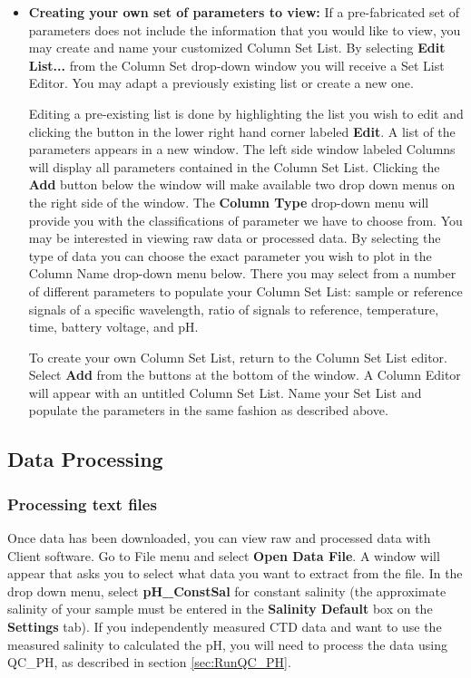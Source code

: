 \begin{itemize}
    \item[] \textbf{Creating your own set of parameters to view:}
    If a pre-fabricated set of parameters does not include the information that you would like to view, you may create and name your customized Column Set List. By selecting \textbf{Edit List...} from the Column Set drop-down window you will receive a Set List Editor. You may adapt a previously existing list or create a new one. 
    
    Editing a pre-existing list is done by highlighting the list you wish to edit and clicking the button in the lower right hand corner labeled \textbf{Edit}. A list of the parameters appears in a new window. The left side window labeled Columns will display all parameters contained in the Column Set List. Clicking the \textbf{Add} button below the window will make available two drop down menus on the right side of the window. The \textbf{Column Type} drop-down menu will provide you with the classifications of parameter we have to choose from. You may be interested in viewing raw data or processed data. By selecting the type of data you can choose the exact parameter you wish to plot in the Column Name drop-down menu below. There you may select from a number of different parameters to populate your Column Set List: sample or reference signals of a specific wavelength, ratio of signals to reference, temperature, time, battery voltage, and pH. 
    
    To create your own Column Set List, return to the Column Set List editor. Select \textbf{Add} from the buttons at the bottom of the window. A Column Editor will appear with an untitled Column Set List. Name your Set List and populate the parameters in the same fashion as described above.  
\end{itemize}


\subsection{Data Processing}

\subsubsection{Processing text files}

\ifcase \inst	%

Once data has been downloaded, you can view raw and processed data with \instType{} Client software. Go to File menu and select \textbf{Open Data File}. A window will appear that asks you to select what data you want to extract from the file. In the drop down menu, select \textbf{pH\_ConstSal} for constant salinity (the approximate salinity of your sample must be entered in the \textbf{Salinity Default} box on the \textbf{Settings} tab). If you independently measured CTD data and want to use the measured salinity to calculated the pH, you will need to process the data using QC\_PH, as described in section \ref{sec:RunQC_PH}.

